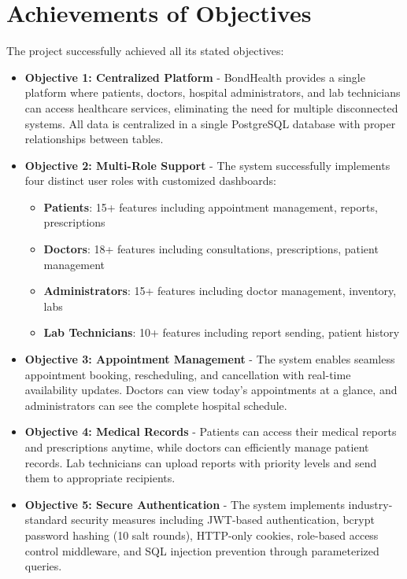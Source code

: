 \section{Achievements of Objectives}
The project successfully achieved all its stated objectives:

\begin{itemize}
    \item \textbf{Objective 1: Centralized Platform} - BondHealth provides a single platform where patients, doctors, hospital administrators, and lab technicians can access healthcare services, eliminating the need for multiple disconnected systems. All data is centralized in a single PostgreSQL database with proper relationships between tables.
    
    \item \textbf{Objective 2: Multi-Role Support} - The system successfully implements four distinct user roles with customized dashboards:
    \begin{itemize}
        \item \textbf{Patients}: 15+ features including appointment management, reports, prescriptions
        \item \textbf{Doctors}: 18+ features including consultations, prescriptions, patient management
        \item \textbf{Administrators}: 15+ features including doctor management, inventory, labs
        \item \textbf{Lab Technicians}: 10+ features including report sending, patient history
    \end{itemize}
    
    \item \textbf{Objective 3: Appointment Management} - The system enables seamless appointment booking, rescheduling, and cancellation with real-time availability updates. Doctors can view today's appointments at a glance, and administrators can see the complete hospital schedule.
    
    \item \textbf{Objective 4: Medical Records} - Patients can access their medical reports and prescriptions anytime, while doctors can efficiently manage patient records. Lab technicians can upload reports with priority levels and send them to appropriate recipients.
    
    \item \textbf{Objective 5: Secure Authentication} - The system implements industry-standard security measures including JWT-based authentication, bcrypt password hashing (10 salt rounds), HTTP-only cookies, role-based access control middleware, and SQL injection prevention through parameterized queries.
    

\end{itemize}
